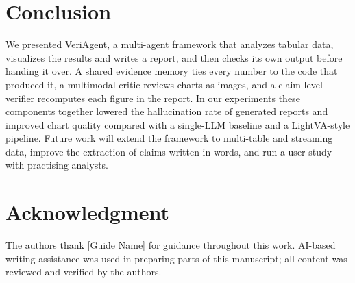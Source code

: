 \documentclass[conference]{IEEEtran}
\begin{document}
\section{Conclusion}

We presented VeriAgent, a multi-agent framework that analyzes tabular data, visualizes the results and writes a report, and then checks its own output before handing it over. A shared evidence memory ties every number to the code that produced it, a multimodal critic reviews charts as images, and a claim-level verifier recomputes each figure in the report. In our experiments these components together lowered the hallucination rate of generated reports and improved chart quality compared with a single-LLM baseline and a LightVA-style pipeline. Future work will extend the framework to multi-table and streaming data, improve the extraction of claims written in words, and run a user study with practising analysts.

\section*{Acknowledgment}
The authors thank [Guide Name] for guidance throughout this work. AI-based writing assistance was used in preparing parts of this manuscript; all content was reviewed and verified by the authors.
\end{document}
